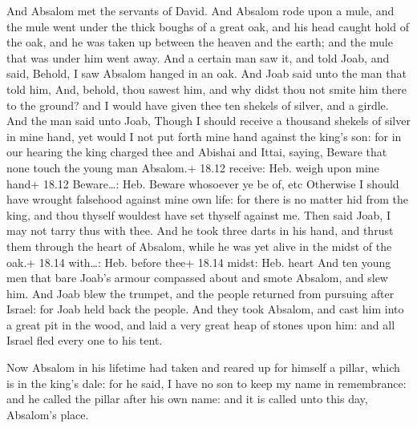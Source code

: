 And Absalom met the servants of David. And Absalom rode
upon a mule, and the mule went under the thick boughs of a great oak,
and his head caught hold of the oak, and he was taken up between the
heaven and the earth; and the mule that was under him went away.
 And a certain man saw it, and told Joab, and said, Behold,
I saw Absalom hanged in an oak.  And Joab said unto the man
that told him, And, behold, thou sawest him, and why didst thou not
smite him there to the ground? and I would have given thee ten shekels
of silver, and a girdle.  And the man said unto Joab,
Though I should receive a thousand shekels of silver in mine hand, yet
would I not put forth mine hand against the king's son: for in our
hearing the king charged thee and Abishai and Ittai, saying, Beware that
none touch the young man Absalom.+ 18.12 receive: Heb. weigh upon mine
hand+ 18.12 Beware\ldots: Heb. Beware whosoever ye be of, etc
 Otherwise I should have wrought falsehood against mine own
life: for there is no matter hid from the king, and thou thyself
wouldest have set thyself against me.  Then said Joab, I
may not tarry thus with thee. And he took three darts in his hand, and
thrust them through the heart of Absalom, while he was yet alive in the
midst of the oak.+ 18.14 with\ldots: Heb. before thee+ 18.14 midst: Heb.
heart  And ten young men that bare Joab's armour compassed
about and smote Absalom, and slew him.  And Joab blew the
trumpet, and the people returned from pursuing after Israel: for Joab
held back the people.  And they took Absalom, and cast him
into a great pit in the wood, and laid a very great heap of stones upon
him: and all Israel fled every one to his tent.

 Now Absalom in his lifetime had taken and reared up for
himself a pillar, which is in the king's dale: for he said, I have no
son to keep my name in remembrance: and he called the pillar after his
own name: and it is called unto this day, Absalom's place.

